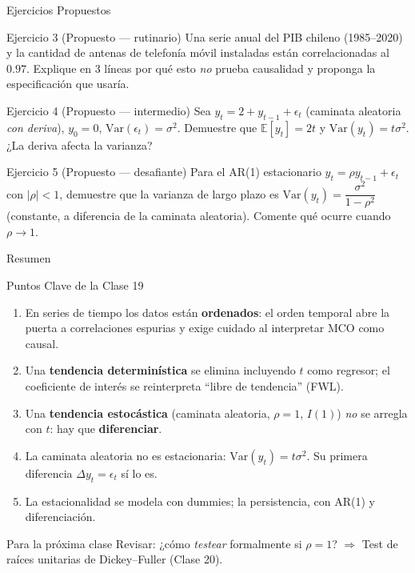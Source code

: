 \documentclass{beamer}
\begin{document}
\begin{frame}{Ejercicios Propuestos}

\begin{block}{Ejercicio 3 (Propuesto --- rutinario)}
Una serie anual del PIB chileno (1985--2020) y la cantidad de antenas de telefonía móvil instaladas están correlacionadas al $0.97$. Explique en 3 líneas por qué esto \emph{no} prueba causalidad y proponga la especificación que usaría.
\end{block}

\begin{block}{Ejercicio 4 (Propuesto --- intermedio)}
Sea $y_t = 2 + y_{t-1} + \epsilon_t$ (caminata aleatoria \emph{con deriva}), $y_0=0$, $\text{Var}(\epsilon_t)=\sigma^2$. Demuestre que $\mathbb{E}[y_t]=2t$ y $\text{Var}(y_t)=t\sigma^2$. ¿La deriva afecta la varianza?
\end{block}

\begin{block}{Ejercicio 5 (Propuesto --- desafiante)}
Para el AR(1) estacionario $y_t=\rho y_{t-1}+\epsilon_t$ con $|\rho|<1$, demuestre que la varianza de largo plazo es $\text{Var}(y_t)=\dfrac{\sigma^2}{1-\rho^2}$ (constante, a diferencia de la caminata aleatoria). Comente qué ocurre cuando $\rho\to 1$.
\end{block}

\end{frame}

\begin{frame}{Resumen}

\begin{block}{Puntos Clave de la Clase 19}
\begin{enumerate}
    \item En series de tiempo los datos están \textbf{ordenados}: el orden temporal abre la puerta a correlaciones espurias y exige cuidado al interpretar MCO como causal.
    \item Una \textbf{tendencia determinística} se elimina incluyendo $t$ como regresor; el coeficiente de interés se reinterpreta ``libre de tendencia'' (FWL).
    \item Una \textbf{tendencia estocástica} (caminata aleatoria, $\rho=1$, $I(1)$) \emph{no} se arregla con $t$: hay que \textbf{diferenciar}.
    \item La caminata aleatoria no es estacionaria: $\text{Var}(y_t)=t\sigma^2$. Su primera diferencia $\Delta y_t=\epsilon_t$ sí lo es.
    \item La estacionalidad se modela con dummies; la persistencia, con AR(1) y diferenciación.
\end{enumerate}
\end{block}

\begin{alertblock}{Para la próxima clase}
Revisar: ¿cómo \emph{testear} formalmente si $\rho=1$? $\Rightarrow$ Test de raíces unitarias de Dickey--Fuller (Clase 20).
\end{alertblock}

\end{frame}
\end{document}
